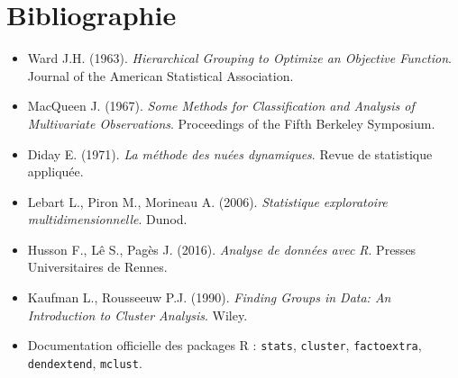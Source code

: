 \documentclass[11pt,a4paper]{report}
\begin{document}
	\chapter*{Bibliographie}
	
	\begin{itemize}[label={}, leftmargin=0em, itemindent=1.5em]
		\item Ward J.H. (1963). \emph{Hierarchical Grouping to Optimize an Objective Function}. Journal of the American Statistical Association.
		\item MacQueen J. (1967). \emph{Some Methods for Classification and Analysis of Multivariate Observations}. Proceedings of the Fifth Berkeley Symposium.
		\item Diday E. (1971). \emph{La méthode des nuées dynamiques}. Revue de statistique appliquée.
		\item Lebart L., Piron M., Morineau A. (2006). \emph{Statistique exploratoire multidimensionnelle}. Dunod.
		\item Husson F., Lê S., Pagès J. (2016). \emph{Analyse de données avec R}. Presses Universitaires de Rennes.
		\item Kaufman L., Rousseeuw P.J. (1990). \emph{Finding Groups in Data: An Introduction to Cluster Analysis}. Wiley.
		\item Documentation officielle des packages R : \texttt{stats}, \texttt{cluster}, \texttt{factoextra}, \texttt{dendextend}, \texttt{mclust}.
	\end{itemize}
	
\end{document}
